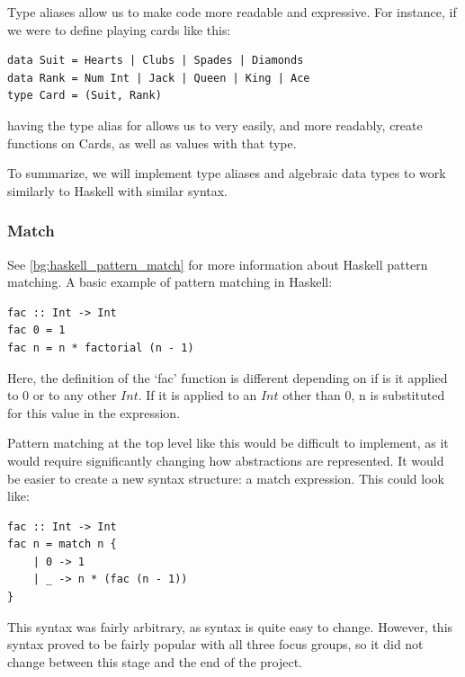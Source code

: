 Type aliases allow us to make code more readable and expressive. For instance, if we were to define playing cards like this:
\begin{lstlisting}[language=SFL_unboxed]
data Suit = Hearts | Clubs | Spades | Diamonds
data Rank = Num Int | Jack | Queen | King | Ace
type Card = (Suit, Rank)
\end{lstlisting}

\noindent having the type alias  for  allows us to very easily, and more readably, create functions on Cards, as well as values with that type. 

To summarize, we will implement type aliases and algebraic data types to work similarly to Haskell with similar syntax. %

\subsubsection{Match}
\label{c2_design_match}
See \ref{bg:haskell_pattern_match} for more information about Haskell pattern matching. A basic example of pattern matching in Haskell: 

\begin{lstlisting}[language=SFL]
fac :: Int -> Int
fac 0 = 1
fac n = n * factorial (n - 1)
\end{lstlisting}

Here, the definition of the `fac' function is different depending on if is it applied to $0$ or to any other $Int$. If it is applied to an $Int$ other than 0, n is substituted for this value in the expression.

Pattern matching at the top level like this would be difficult to implement, as it would require significantly changing how abstractions are represented. It would be easier to create a new syntax structure: a match expression. This could look like:

\begin{lstlisting}[language=SFL]
fac :: Int -> Int
fac n = match n {
    | 0 -> 1
    | _ -> n * (fac (n - 1))
}
\end{lstlisting}
This syntax was fairly arbitrary, as syntax is quite easy to change. However, this syntax proved to be fairly popular with all three focus groups, so it did not change between this stage and the end of the project. 


